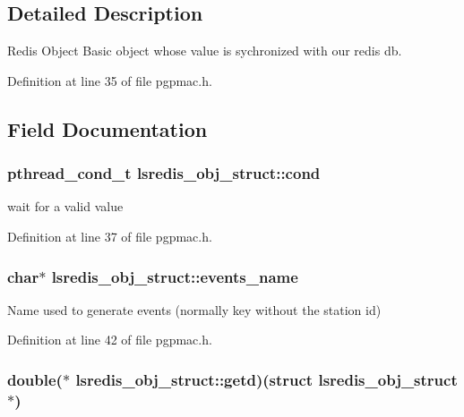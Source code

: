 \subsection{Detailed Description}
Redis Object Basic object whose value is sychronized with our redis db. 

Definition at line 35 of file pgpmac.\-h.



\subsection{Field Documentation}
\hypertarget{structlsredis__obj__struct_a356f6a228bb19ac7d66fdb1c875d68be}{
\subsubsection[{cond}]{\setlength{\rightskip}{0pt plus 5cm}pthread\-\_\-cond\-\_\-t lsredis\-\_\-obj\-\_\-struct\-::cond}}\label{structlsredis__obj__struct_a356f6a228bb19ac7d66fdb1c875d68be}


wait for a valid value 



Definition at line 37 of file pgpmac.\-h.

\hypertarget{structlsredis__obj__struct_ad0a987a011b580eab739cda831f78fbb}{
\subsubsection[{events\-\_\-name}]{\setlength{\rightskip}{0pt plus 5cm}char$\ast$ lsredis\-\_\-obj\-\_\-struct\-::events\-\_\-name}}\label{structlsredis__obj__struct_ad0a987a011b580eab739cda831f78fbb}


Name used to generate events (normally key without the station id) 



Definition at line 42 of file pgpmac.\-h.

\hypertarget{structlsredis__obj__struct_a6e8586747a0453b16e5b5104c41eab76}{
\subsubsection[{getd}]{\setlength{\rightskip}{0pt plus 5cm}double($\ast$ lsredis\-\_\-obj\-\_\-struct\-::getd)(struct {\bf lsredis\-\_\-obj\-\_\-struct} $\ast$)}}\label{structlsredis__obj__struct_a6e8586747a0453b16e5b5104c41eab76}


